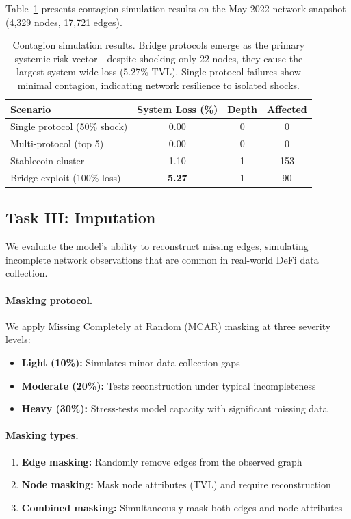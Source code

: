 Table~\ref{tab:contagion-results} presents contagion simulation results on the May 2022 network snapshot (4,329 nodes, 17,721 edges).

\begin{table}[t]
\centering
\small
\begin{tabular}{lccc}
\hline
\textbf{Scenario} & \textbf{System Loss (\%)} & \textbf{Depth} & \textbf{Affected} \\
\hline
Single protocol (50\% shock) & 0.00 & 0 & 0 \\
Multi-protocol (top 5) & 0.00 & 0 & 0 \\
Stablecoin cluster & 1.10 & 1 & 153 \\
Bridge exploit (100\% loss) & \textbf{5.27} & 1 & 90 \\
\hline
\end{tabular}
\caption{Contagion simulation results. Bridge protocols emerge as the primary systemic risk vector---despite shocking only 22 nodes, they cause the largest system-wide loss (5.27\% TVL). Single-protocol failures show minimal contagion, indicating network resilience to isolated shocks.}
\label{tab:contagion-results}
\end{table}

\subsection{Task III: Imputation}
\label{subsec:imputation}

We evaluate the model's ability to reconstruct missing edges, simulating incomplete network observations that are common in real-world DeFi data collection.

\paragraph{Masking protocol.}
We apply Missing Completely at Random (MCAR) masking at three severity levels:
\begin{itemize}
  \item \textbf{Light (10\%):} Simulates minor data collection gaps
  \item \textbf{Moderate (20\%):} Tests reconstruction under typical incompleteness
  \item \textbf{Heavy (30\%):} Stress-tests model capacity with significant missing data
\end{itemize}

\paragraph{Masking types.}
\begin{enumerate}
  \item \textbf{Edge masking:} Randomly remove edges from the observed graph
  \item \textbf{Node masking:} Mask node attributes (TVL) and require reconstruction
  \item \textbf{Combined masking:} Simultaneously mask both edges and node attributes
\end{enumerate}

